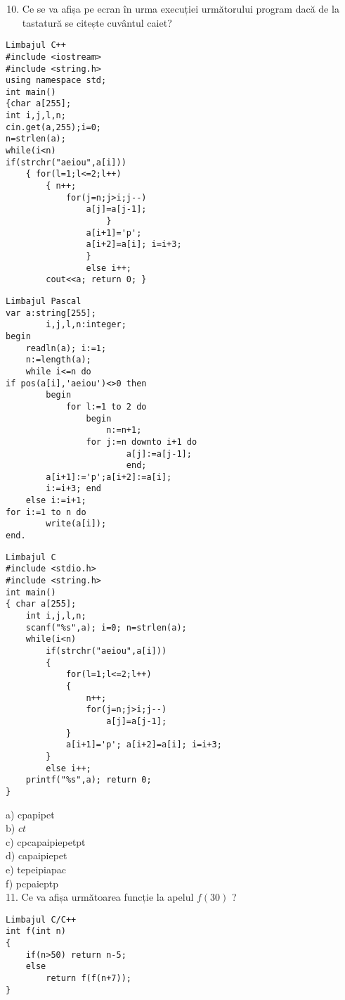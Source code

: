 \begin{enumerate}
  \setcounter{enumi}{9}
  \item Ce se va afișa pe ecran în urma execuției următorului program dacă de la tastatură se citește cuvântul caiet?
\end{enumerate}

\begin{verbatim}
Limbajul C++
#include <iostream>
#include <string.h>
using namespace std;
int main()
{char a[255];
int i,j,l,n;
cin.get(a,255);i=0;
n=strlen(a);
while(i<n)
if(strchr("aeiou",a[i]))
    { for(l=1;l<=2;l++)
        { n++;
            for(j=n;j>i;j--)
                a[j]=a[j-1];
                    }
                a[i+1]='p';
                a[i+2]=a[i]; i=i+3;
                }
                else i++;
        cout<<a; return 0; }
\end{verbatim}

\begin{verbatim}
Limbajul Pascal
var a:string[255];
        i,j,l,n:integer;
begin
    readln(a); i:=1;
    n:=length(a);
    while i<=n do
if pos(a[i],'aeiou')<>0 then
        begin
            for l:=1 to 2 do
                begin
                    n:=n+1;
                for j:=n downto i+1 do
                        a[j]:=a[j-1];
                        end;
        a[i+1]:='p';a[i+2]:=a[i];
        i:=i+3; end
    else i:=i+1;
for i:=1 to n do
        write(a[i]);
end.
\end{verbatim}

\begin{verbatim}
Limbajul C
#include <stdio.h>
#include <string.h>
int main()
{ char a[255];
    int i,j,l,n;
    scanf("%s",a); i=0; n=strlen(a);
    while(i<n)
        if(strchr("aeiou",a[i]))
        {
            for(l=1;l<=2;l++)
            {
                n++;
                for(j=n;j>i;j--)
                    a[j]=a[j-1];
            }
            a[i+1]='p'; a[i+2]=a[i]; i=i+3;
        }
        else i++;
    printf("%s",a); return 0;
}
\end{verbatim}

a) cpapipet\\
b) $c t$\\
c) cpcapaipiepetpt\\
d) capaipiepet\\
e) tepeipiapac\\
f) pcpaieptp\\
11. Ce va afișa următoarea funcție la apelul $f(30)$ ?

\begin{verbatim}
Limbajul C/C++
int f(int n)
{
    if(n>50) return n-5;
    else
        return f(f(n+7));
}
\end{verbatim}

